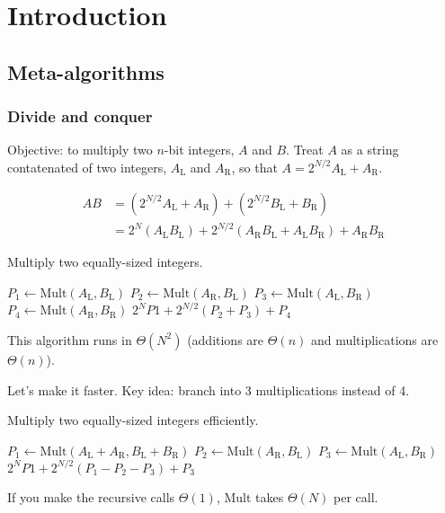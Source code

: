 \chapter{Introduction}
\section{Meta-algorithms}
\subsection{Divide and conquer}
Objective: to multiply two \(n\)-bit integers, \(A\) and \(B\).
Treat \(A\) as a string contatenated of two integers, \(A_\text{L}\) and \(A_\text{R}\),
so that \(A = 2^{N/2}A_\text{L} + A_\text{R}\).

\begin{align}
	AB &= \left(2^{N/2} A_\text{L} + A_\text{R}\right) + \left(2^{N/2} B_\text{L} + B_\text{R}\right) \\
		&= 2^N\left(A_\text{L}B_\text{L}\right) + 2^{N/2}\left(A_\text{R}B_\text{L} + A_\text{L}B_\text{R}\right) + A_\text{R}B_\text{R}
\end{align}

\begin{algorithm}
	\caption{Multiply two equally-sized integers.}
	\begin{algorithmic}
		\State \(P_1 \leftarrow \text{Mult}(A_\text{L}, B_\text{L})\)
		\State \(P_2 \leftarrow \text{Mult}(A_\text{R}, B_\text{L})\)
		\State \(P_3 \leftarrow \text{Mult}(A_\text{L}, B_\text{R})\)
		\State \(P_4 \leftarrow \text{Mult}(A_\text{R}, B_\text{R})\)
		\State\Return \(2^NP1 + 2^{N/2}\left(P_2 + P_3\right) + P_4\)
		\EndFunction
	\end{algorithmic}
\end{algorithm}

This algorithm runs in \(\Theta(N^2)\) (additions are \(\Theta(n)\) and multiplications are \(\Theta(n)\)).

Let's make it faster. Key idea: branch into 3 multiplications instead of 4.
\begin{algorithm}
	\caption{Multiply two equally-sized integers efficiently.}
	\begin{algorithmic}
		\Function{Mult}{$A,B$}
		\State \(P_1 \leftarrow \text{Mult}(A_\text{L} + A_\text{R}, B_\text{L} + B_\text{R})\)
		\State \(P_2 \leftarrow \text{Mult}(A_\text{R}, B_\text{L})\)
		\State \(P_3 \leftarrow \text{Mult}(A_\text{L}, B_\text{R})\)
		\State\Return \(2^NP1 + 2^{N/2}\left(P_1 - P_2 - P_3\right) + P_3\)
		\EndFunction
	\end{algorithmic}
\end{algorithm}

If you make the recursive calls \(\Theta(1)\), \(\text{Mult}\) takes \(\Theta(N)\) per call.
